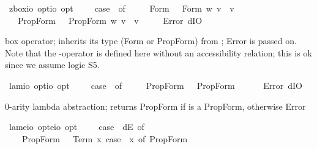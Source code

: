\begin{isabellebody}
\begin{isamarkuptext}
\end{isamarkuptext}%
\isamarkuptrue%
\isamarkupfalse%
\ z{\isacharunderscore}box{\isacharcolon}{\isacharcolon}{\isachardoublequoteopen}io\ opt{\isasymRightarrow}io\ opt{\isachardoublequoteclose}\ \ {\isachardoublequoteopen}{\isasymbox}\ {\isasymphi}\ {\isasymequiv}\ case\ {\isasymphi}\ of\ \isanewline
\ \ \ \ Form\ {\isasympsi}\ {\isasymRightarrow}\ Form\ {\isacharparenleft}{\isasymlambda}w{\isachardot}\ {\isasymforall}v{\isachardot}\ {\isasympsi}\ v{\isacharparenright}\isanewline
\ \ {\isacharbar}\ PropForm\ {\isasympsi}\ {\isasymRightarrow}\ PropForm\ {\isacharparenleft}{\isasymlambda}w{\isachardot}\ {\isasymforall}v{\isachardot}\ {\isasympsi}\ v{\isacharparenright}\isanewline
\ \ {\isacharbar}\ {\isacharunderscore}\ {\isasymRightarrow}\ Error\ dIO{\isachardoublequoteclose}%
\begin{isamarkuptext}%
box operator; \isa{{\isasymbox}\ {\isasymphi}} inherits its type (Form or PropForm) from \isa{{\isasymphi}}; Error is passed on.
Note that the \isa{{\isasymbox}}-operator is defined here without an accessibility relation; this is ok since we assume logic S5.%
\end{isamarkuptext}%
\isamarkuptrue%
\isamarkupfalse%
\ lam{}{\isacharcolon}{\isacharcolon}{\isachardoublequoteopen}io\ opt{\isasymRightarrow}io\ opt{\isachardoublequoteclose}\ \ {\isachardoublequoteopen}{\isasymlambda}\ {\isasymphi}\ {\isasymequiv}\ case\ {\isasymphi}\ of\ \isanewline
\ \ \ \ PropForm\ {\isasympsi}\ {\isasymRightarrow}\ PropForm\ {\isasympsi}\isanewline
\ \ {\isacharbar}\ {\isacharunderscore}\ {\isasymRightarrow}\ Error\ dIO{\isachardoublequoteclose}%
\begin{isamarkuptext}%
0-arity lambda abstraction;  returns PropForm \isa{{\isasymphi}} if \isa{{\isasymphi}} is a PropForm, otherwise Error%
\end{isamarkuptext}%
\isamarkuptrue%
\isamarkupfalse%
\ lam{}{\isacharcolon}{\isacharcolon}{\isachardoublequoteopen}{\isacharparenleft}e{\isasymRightarrow}io\ opt{\isacharparenright}{\isasymRightarrow}{\isacharparenleft}e{\isasymRightarrow}io{\isacharparenright}\ opt{\isachardoublequoteclose}\ \ {\isachardoublequoteopen}{\isasymlambda}\ {\isasymPhi}\ {\isasymequiv}\ case\ {\isacharparenleft}{\isasymPhi}\ dE{\isacharparenright}\ of\isanewline
\ \ \ \ PropForm\ {\isasymphi}\ {\isasymRightarrow}\ Term\ {\isacharparenleft}{\isasymlambda}x{\isachardot}\ case\ {\isacharparenleft}{\isasymPhi}\ x{\isacharparenright}\ of\ PropForm\ {\isasymphi}\ {\isasymRightarrow}\ {\isasymphi}{\isacharparenright}\isanewline

\end{isabellebody}
